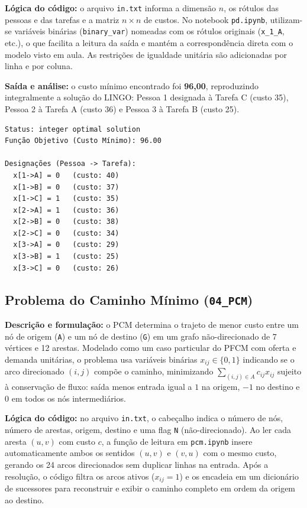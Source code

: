 \documentclass[11pt,a4paper]{article}
\begin{document}
\textbf{Lógica do código:} o arquivo \texttt{in.txt} informa a dimensão $n$, os rótulos das pessoas e das tarefas e a matriz $n \times n$ de custos. No notebook \texttt{pd.ipynb}, utilizam-se variáveis binárias (\texttt{binary\_var}) nomeadas com os rótulos originais (\texttt{x\_1\_A}, etc.), o que facilita a leitura da saída e mantém a correspondência direta com o modelo visto em aula. As restrições de igualdade unitária são adicionadas por linha e por coluna.

\textbf{Saída e análise:} o custo mínimo encontrado foi \textbf{96,00}, reproduzindo integralmente a solução do LINGO: Pessoa 1 designada à Tarefa C (custo 35), Pessoa 2 à Tarefa A (custo 36) e Pessoa 3 à Tarefa B (custo 25).

\begin{minipage}{\linewidth}
\begin{lstlisting}
Status: integer optimal solution
Função Objetivo (Custo Mínimo): 96.00

Designações (Pessoa -> Tarefa):
  x[1->A] = 0   (custo: 40)
  x[1->B] = 0   (custo: 37)
  x[1->C] = 1   (custo: 35)
  x[2->A] = 1   (custo: 36)
  x[2->B] = 0   (custo: 38)
  x[2->C] = 0   (custo: 34)
  x[3->A] = 0   (custo: 29)
  x[3->B] = 1   (custo: 25)
  x[3->C] = 0   (custo: 26)
\end{lstlisting}
\end{minipage}

\subsection{Problema do Caminho Mínimo (\texttt{04\_PCM})}
\textbf{Descrição e formulação:} o PCM determina o trajeto de menor custo entre um nó de origem (\texttt{A}) e um nó de destino (\texttt{G}) em um grafo não-direcionado de 7 vértices e 12 arestas. Modelado como um caso particular do PFCM com oferta e demanda unitárias, o problema usa variáveis binárias $x_{ij} \in \{0,1\}$ indicando se o arco direcionado $(i,j)$ compõe o caminho, minimizando $\sum_{(i,j)\in A} c_{ij} x_{ij}$ sujeito à conservação de fluxo: saída menos entrada igual a $1$ na origem, $-1$ no destino e $0$ em todos os nós intermediários.

\textbf{Lógica do código:} no arquivo \texttt{in.txt}, o cabeçalho indica o número de nós, número de arestas, origem, destino e uma flag \texttt{N} (não-direcionado). Ao ler cada aresta $(u,v)$ com custo $c$, a função de leitura em \texttt{pcm.ipynb} insere automaticamente ambos os sentidos $(u,v)$ e $(v,u)$ com o mesmo custo, gerando os 24 arcos direcionados sem duplicar linhas na entrada. Após a resolução, o código filtra os arcos ativos ($x_{ij} = 1$) e os encadeia em um dicionário de sucessores para reconstruir e exibir o caminho completo em ordem da origem ao destino.
\end{document}
